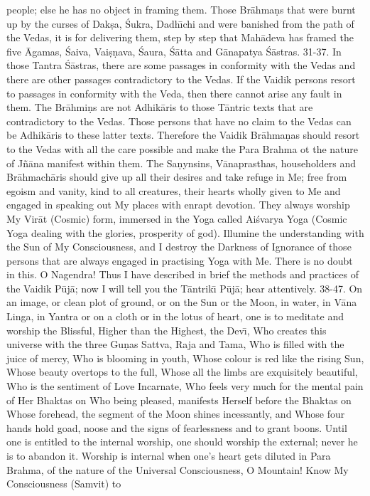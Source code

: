 people; else he has no object in framing them. Those Br\=ahma\d{n}s that were burnt up by the curses of Dak\d{s}a, \'Sukra, Dadh\={\i}chi and were banished from the path of the Vedas, it is for delivering them, step by step that Mah\=adeva has framed the five \=Agamas, \'Saiva, Vai\d{s}\d{n}ava, \'Saura, \'S\=atta and G\=anapatya \'S\=astras.
31-37. In those Tantra \'S\=astras, there are some passages in conformity with the Vedas and there are other passages contradictory to the Vedas. If the Vaidik persons resort to passages in conformity with the Veda, then there cannot arise any fault in them. The Br\=ahmi\d{n}s are not Adhik\=aris to those T\=antric texts that are contradictory to the Vedas. Those persons that have no claim to the Vedas can be Adhik\=aris to these latter texts. Therefore the Vaidik Br\=ahma\d{n}as should resort to the Vedas with all the care possible and make the Para Brahma ot the nature of J\~n\=ana manifest within them. The Sa\d{n}ynsins, V\=anaprasthas, householders and Br\=ahmach\=aris should give up all their desires and take refuge in Me; free from egoism and vanity, kind to all creatures, their hearts wholly given to Me and engaged in speaking out My places with enrapt devotion. They always worship My Vir\=at (Cosmic) form, immersed in the Yoga called Ai\'svarya Yoga (Cosmic Yoga dealing with the glories, prosperity of god). Illumine the understanding with the Sun of My Consciousness, and I destroy the Darkness of Ignorance of those persons that are always engaged in practising Yoga with Me. There is no doubt in this. O Nagendra! Thus I have described in brief the methods and practices of the Vaidik P\=uj\=a; now I will tell you the T\=antrik\={\i} P\=uj\=a; hear attentively.
38-47. On an image, or clean plot of ground, or on the Sun or the Moon, in water, in V\=ana Linga, in Yantra or on a cloth or in the lotus of heart, one is to meditate and worship the Blissful, Higher than the Highest, the Dev\={\i}, Who creates this universe with the three Gu\d{n}as Sattva, Raja and Tama, Who is filled with the juice of mercy, Who is blooming in youth, Whose colour is red like the rising Sun, Whose beauty overtops to the full, Whose all the limbs are exquisitely beautiful, Who is the sentiment of Love Incarnate, Who feels very much for the mental pain of Her Bhaktas on Who being pleased, manifests Herself before the Bhaktas on Whose forehead, the segment of the Moon shines incessantly, and Whose four hands hold goad, noose and the signs of fearlessness and to grant boons. Until one is entitled to the internal worship, one should worship the external; never he is to abandon it. Worship is internal when one's heart gets diluted in Para Brahma, of the nature of the Universal Consciousness, O Mountain! Know My Consciousness (Samvit) to

